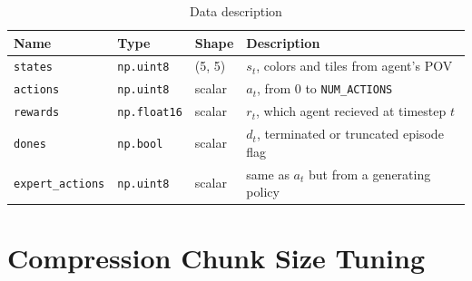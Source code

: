 \documentclass{article}
\begin{document}
\begin{table}[h]
\centering
\caption{Data description}
\label{tab:data-desc}
\begin{tabular}{@{}llll@{}}
\toprule
\textbf{Name}           & \textbf{Type}       & \textbf{Shape}  & \textbf{Description}                             \\ \midrule
\texttt{states}         & \texttt{np.uint8}   & (5, 5) & $s_t$, colors and tiles from agent's POV                  \\
\texttt{actions}        & \texttt{np.uint8}   & scalar & $a_t$, from $0$ to \texttt{NUM\_ACTIONS} \\
\texttt{rewards}        & \texttt{np.float16} & scalar & $r_t$, which agent recieved at timestep $t$               \\
\texttt{dones}          & \texttt{np.bool}    & scalar & $d_t$, terminated or truncated episode flag               \\
\texttt{expert\_actions} & \texttt{np.uint8}   & scalar & same as $a_t$ but from a generating policy                \\ \bottomrule
\end{tabular}
\end{table}






\section{Compression Chunk Size Tuning}
\label{app:chunks}
\end{document}
